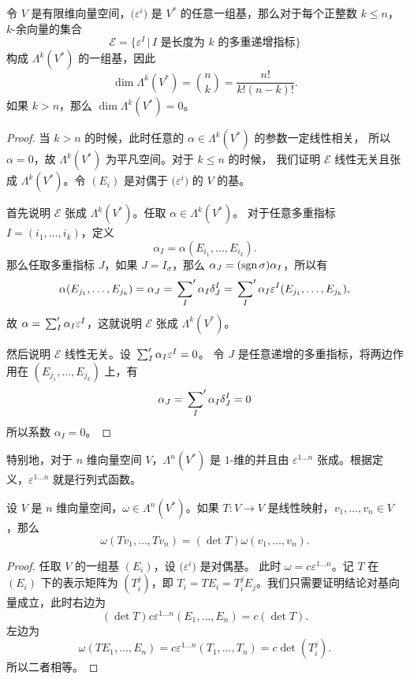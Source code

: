 \begin{proposition}
  令 $V$ 是有限维向量空间，$\bigl(\varepsilon^i\bigr)$ 是 $V^*$
  的任意一组基，那么对于每个正整数 $k\leq n$，$k$-余向量的集合
  \[
    \mathcal{E}=\bigl\{\varepsilon^I\,|\, \text{$I$ 是长度为 $k$ 的多重递增指标}\bigr\}  
  \]
  构成 $\Lambda^k(V^*)$ 的一组基，因此
  \[
    \dim\Lambda^k(V^*)=\binom{n}{k}=\frac{n!}{k!(n-k)!}.  
  \]
  如果 $k> n$，那么 $\dim\Lambda^k(V^*)=0$。
\end{proposition}
\begin{proof}
  当 $k>n$ 的时候，此时任意的 $\alpha\in \Lambda^k(V^*)$ 的参数一定线性相关，
  所以 $\alpha=0$，故 $\Lambda^k(V^*)$ 为平凡空间。对于 $k\le n$ 的时候，
  我们证明 $\mathcal{E}$ 线性无关且张成 $\Lambda^k(V^*)$。令 $(E_i)$
  是对偶于 $\bigl(\varepsilon^i\bigr)$ 的 $V$ 的基。

  首先说明 $\mathcal{E}$ 张成 $\Lambda^k(V^*)$。任取 $\alpha\in \Lambda^k(V^*)$。
  对于任意多重指标 $I=(i_1,\dots,i_k)$，定义
  \[
    \alpha_I=\alpha(E_{i_1},\dots,E_{i_k}).  
  \]
  那么任取多重指标 $J$，如果 $J=I_\sigma$，那么 $\alpha_J=(\operatorname{sgn}\sigma)\alpha_I$，所以有
  \[
    \alpha(E_{j_1},\dots,E_{j_k})=\alpha_J=\sideset{}{'}\sum_{I}\alpha_I\delta_J^I
    =  \sideset{}{'}\sum_I\alpha_I\varepsilon^I(E_{j_1},\dots,E_{j_k}),
  \]
  故 $\alpha=\sideset{}{'}{\textstyle\sum_I}\alpha_I\varepsilon^I$，这就说明  $\mathcal{E}$ 张成 $\Lambda^k(V^*)$。

  然后说明 $\mathcal{E}$ 线性无关。设 $\sideset{}{'}{\textstyle\sum_I}\alpha_I\varepsilon^I=0$。
  令 $J$ 是任意递增的多重指标，将两边作用在 $(E_{j_1},\dots,E_{j_k})$ 上，有
  \[
    \alpha_J=\sideset{}{'}\sum_I\alpha_I\delta_J^I=0  
  \]
  所以系数 $\alpha_I=0$。
\end{proof}

特别地，对于 $n$ 维向量空间 $V$，$\Lambda^n(V^*)$ 是 $1$-维的并且由
$\varepsilon^{1\dots n}$ 张成。根据定义，$\varepsilon^{1\dots n}$
就是行列式函数。

\begin{proposition}
  设 $V$ 是 $n$ 维向量空间，$\omega\in \Lambda^n(V^*)$。如果 $T:V\to V$
  是线性映射，$v_1,\dots,v_n\in V$，那么
  \begin{equation}
    \omega(Tv_1,\dots,Tv_n)=(\det T)\omega(v_1,\dots,v_n).
  \end{equation}
\end{proposition}
\begin{proof}
  任取 $V$ 的一组基 $(E_i)$，设 $\bigl(\varepsilon^i\bigr)$ 是对偶基。
  此时 $\omega=c\varepsilon^{1\dots n}$。记 $T$ 在 $(E_i)$ 下的表示矩阵为
  $(T_i^j)$，即 $T_i=TE_i=T_i^jE_j$。我们只需要证明结论对基向量成立，此时右边为
  \[
    (\det T)c\varepsilon^{1\dots n}(E_1,\dots,E_n)=c(\det T).
  \]
  左边为
  \[
    \omega(TE_1,\dots,E_n)=c\varepsilon^{1\dots n}
    (T_1,\dots,T_n)=c\det (T_i^j).  
  \]
  所以二者相等。
\end{proof}

